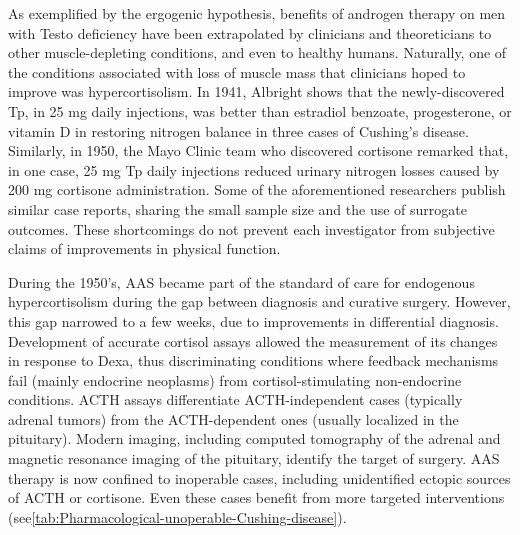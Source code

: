 \documentclass[12pt,english]{report}\usepackage[]{graphicx}\usepackage[]{color}
\begin{document}
As exemplified by the ergogenic hypothesis, benefits of androgen therapy
on men with Testo deficiency have been extrapolated by clinicians
and theoreticians to other muscle-depleting conditions, and even to
healthy humans. Naturally, one of the conditions associated with loss
of muscle mass that clinicians hoped to improve was hypercortisolism.
In 1941, Albright shows that the newly-discovered Tp, in 25 mg daily
injections, was better than estradiol benzoate, progesterone, or vitamin
D in restoring nitrogen balance in three cases of Cushing's disease\citep{albright1941cushings}.
Similarly, in 1950, the Mayo Clinic team who discovered cortisone
remarked that, in one case, 25 mg Tp daily injections reduced urinary
nitrogen losses caused by 200 mg cortisone administration\citep{sprague1950observations}.
Some of the aforementioned researchers publish similar case reports,
sharing the small sample size and the use of surrogate outcomes\citep{keutmann1948metabolic}.
These shortcomings do not prevent each investigator from subjective
claims of improvements in physical function.

During the 1950's, AAS became part of the standard of care for endogenous
hypercortisolism during the gap between diagnosis and curative surgery.
However, this gap narrowed to a few weeks, due to improvements in
differential diagnosis. Development of accurate cortisol assays allowed
the measurement of its changes in response to Dexa, thus discriminating
conditions where feedback mechanisms fail (mainly endocrine neoplasms)
from cortisol-stimulating non-endocrine conditions. ACTH assays differentiate
ACTH-independent cases (typically adrenal tumors) from the ACTH-dependent
ones (usually localized in the pituitary). Modern imaging, including
computed tomography of the adrenal and magnetic resonance imaging
of the pituitary, identify the target of surgery. AAS therapy is now
confined to inoperable cases, including unidentified ectopic sources
of ACTH or cortisone. Even these cases benefit from more targeted
interventions (see\ref{tab:Pharmacological-unoperable-Cushing-disease}).
\end{document}
